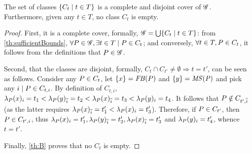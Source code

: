 \documentclass[pagesize, twoside=off, bibliography=totoc, DIV=calc, fontsize=12pt, a4paper]{scrartcl}
\begin{document}
\begin{theorem}
	\label{th:cover}
	The set of classes $\set{C_t \suchthat t \in T}$ is a complete and disjoint cover of $\mathscr{G}$. 
	Furthermore, given any $t \in T$, no class $C_t$ is empty.
\end{theorem}
\begin{proof}
	First, it is a complete cover, formally, $\fprofs = \bigcup \set{C_t \suchthat t \in T}$: from \cref{th:sufficientBounds}, $\forall \prof \in \fprofs, \exists t \in T \suchthat \prof \in C_t$; and conversely, $\forall t \in T, P \in C_t$, it follows from the definitions that $P \in \mathscr{G}$.
	
	Second, that the classes are disjoint, formally, $C_t \cap C_{t'} ≠ \emptyset ⇒ t = t'$, can be seen as follows. 
	Consider any $P \in C_t$, let $\{x\} = \mathit{FB}(P)$ and $\{y\} = \mathit{MS(P)}$ and pick any $i \suchthat \prof \in C_{t, i}$. 
	By definition of $C_{t, i}$, $\lambda_P(x)_i = t_1 < \lambda_P(y)_{\overline{i}} = t_2 < \lambda_P(x)_{\overline{i}} = t_3 < \lambda_P(y)_i = t_4$. 
	It follows that $P \notin C_{t', \overline{i}}$ (as the latter requires $\lambda_P(x)_{\overline{i}} = t'_1 < \lambda_P(x)_i = t'_3$).
	Therefore, if $P \in C_{t'}$, then $P \in C_{t', i}$, thus $\lambda_P(x)_i = t'_1, \lambda_P(y)_{\overline{i}} = t'_2, \lambda_P(x)_{\overline{i}} = t'_3$ and $\lambda_P(y)_i = t'_4$, whence $t = t'$.
	
	Finally, \cref{th:B} proves that no $C_t$ is empty.
\end{proof}
\end{document}
